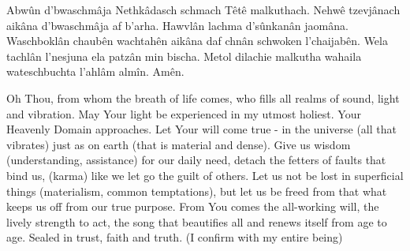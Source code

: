 
  \large
  \beginverse
    Abwûn d'bwaschmâja
  \endverse
  \beginverse
    Nethkâdasch schmach
  \endverse
  \beginverse
    Têtê malkuthach.
  \endverse
  \beginverse
    Nehwê tzevjânach aikâna d'bwaschmâja af b'arha.
  \endverse
  \beginverse
    Hawvlân lachma d'sûnkanân jaomâna.
  \endverse
  \beginverse
    Waschboklân chaubên wachtahên aikâna
    daf chnân schwoken l'chaijabên.
  \endverse
  \beginverse
    Wela tachlân l'nesjuna
  \endverse
  \beginverse
    ela patzân min bischa.
  \endverse
  \beginverse
    Metol dilachie malkutha wahaila wateschbuchta l'ahlâm almîn.
  \endverse
  \beginverse
    Amên.
  \endverse
  
  \begin{translation}
    Oh Thou, from whom the breath of life comes,
    who fills all realms of sound, light and vibration. 
    \nextverse
    May Your light be experienced in my utmost holiest. 
    \nextverse
    Your Heavenly Domain approaches. 
    \nextverse
    Let Your will come true - in the universe (all that vibrates)
    just as on earth (that is material and dense). 
    \nextverse
    Give us wisdom (understanding, assistance) for our daily need, 
    \nextverse
    detach the fetters of faults that bind us, (karma)
    like we let go the guilt of others. 
    \nextverse
    Let us not be lost in superficial things (materialism, common temptations), 
    \nextverse
    but let us be freed from that what keeps us off from our true purpose. 
    \nextverse
    From You comes the all-working will, the lively strength to act,
    the song that beautifies all and renews itself from age to age. 
    \nextverse
    Sealed in trust, faith and truth.
    (I confirm with my entire being)    
  \end{translation}
\endsong


